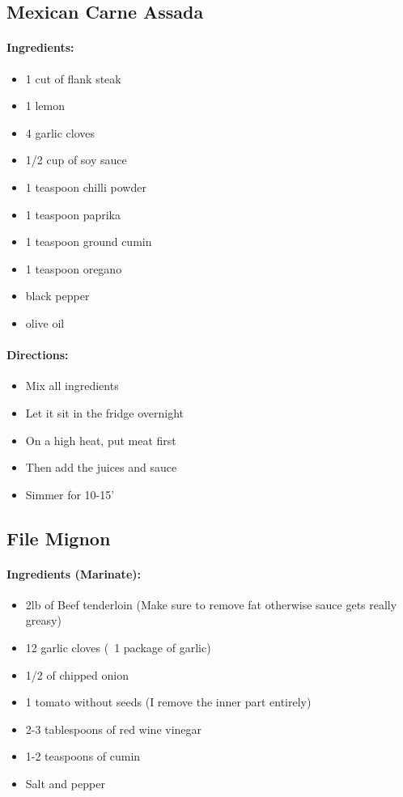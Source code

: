 \documentclass{article}
\begin{document}
\subsection{Mexican Carne Assada}

\paragraph{Ingredients:}
\begin{itemize}
    \item 1 cut of flank steak
    \item 1 lemon
    \item 4 garlic cloves
    \item 1/2 cup of soy sauce
    \item 1 teaspoon chilli powder
    \item 1 teaspoon paprika
    \item 1 teaspoon ground cumin
    \item 1 teaspoon oregano
    \item black pepper
    \item olive oil
\end{itemize}

\paragraph{Directions:}
\begin{itemize}
    \item Mix all ingredients
    \item Let it sit in the fridge overnight
    \item On a high heat, put meat first
    \item Then add the juices and sauce
    \item Simmer for 10-15'
\end{itemize}

\subsection{File Mignon} 

\paragraph{Ingredients (Marinate):}
\begin{itemize}
    \item 2lb of Beef tenderloin (Make sure to remove fat otherwise sauce gets really greasy)
    \item 12 garlic cloves (~1 package of garlic)
    \item 1/2 of chipped onion
    \item 1 tomato without seeds (I remove the inner part entirely)
    \item 2-3 tablespoons of red wine vinegar
    \item 1-2 teaspoons of cumin
    \item Salt and pepper
\end{itemize}  
\end{document}

